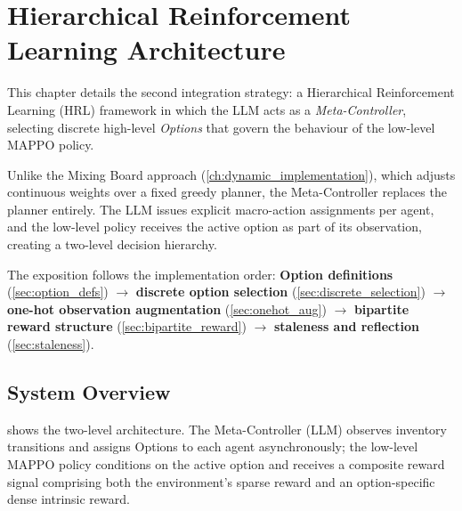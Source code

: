 \section{Hierarchical Reinforcement Learning Architecture}
\label{ch:hrl_architecture}

This chapter details the second integration strategy: a Hierarchical
Reinforcement Learning (HRL) framework in which the LLM acts as a
\emph{Meta-Controller}, selecting discrete high-level \emph{Options}
that govern the behaviour of the low-level MAPPO policy.

Unlike the Mixing Board approach (\cref{ch:dynamic_implementation}),
which adjusts continuous weights over a fixed greedy planner, the
Meta-Controller replaces the planner entirely.
The LLM issues explicit macro-action assignments per agent, and the
low-level policy receives the active option as part of its observation,
creating a two-level decision hierarchy.

The exposition follows the implementation order:
\textbf{Option definitions} (\cref{sec:option_defs}) $\rightarrow$
\textbf{discrete option selection} (\cref{sec:discrete_selection}) $\rightarrow$
\textbf{one-hot observation augmentation} (\cref{sec:onehot_aug}) $\rightarrow$
\textbf{bipartite reward structure} (\cref{sec:bipartite_reward}) $\rightarrow$
\textbf{staleness and reflection} (\cref{sec:staleness}).

\subsection{System Overview}
\label{sec:hrl_overview}

 shows the two-level architecture.
The Meta-Controller (LLM) observes inventory transitions and
assigns Options to each agent asynchronously; the low-level MAPPO
policy conditions on the active option and receives a composite reward
signal comprising both the environment's sparse reward and
an option-specific dense intrinsic reward.

